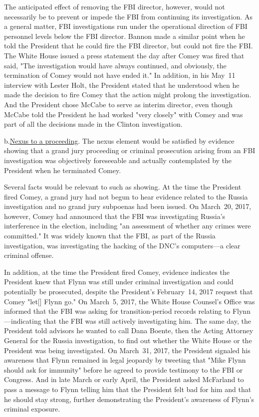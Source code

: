 The anticipated effect of removing the FBI director, however, would not necessarily be to prevent or impede the FBI from continuing its investigation.
As a general matter, FBI investigations run under the operational direction of FBI personnel levels below the FBI director.
Bannon made a similar point when he told the President that he could fire the FBI director, but could not fire the FBI\null.
The White House issued a press statement the day after Comey was fired that said, "The investigation would have always continued, and obviously, the termination of Comey would not have ended it."
In addition, in his May~11 interview with Lester Holt, the President stated that he understood when he made the decision to fire Comey that the action might prolong the investigation.
And the President chose McCabe to serve as interim director, even though McCabe told the President he had worked "very closely" with Comey and was part of all the decisions made in the Clinton investigation.

b.\qquad\underline{Nexus to a proceeding}.
The nexus element would be satisfied by evidence showing that a grand jury proceeding or criminal prosecution arising from an FBI investigation was objectively foreseeable and actually contemplated by the President when he terminated Comey.

Several facts would be relevant to such as showing.
At the time the President fired Comey, a grand jury had not begun to hear evidence related to the Russia investigation and no grand jury subpoenas had been issued.
On March~20, 2017, however, Comey had announced that the FBI was investigating Russia's interference in the election, including "an assessment of whether any crimes were committed."
It was widely known that the FBI, as part of the Russia investigation, was investigating the hacking of the DNC's computers---a clear criminal offense.

In addition, at the time the President fired Comey, evidence indicates the President knew that Flynn was still under criminal investigation and could potentially be prosecuted, despite the President's February~14, 2017 request that Comey "let[] Flynn go."
On March~5, 2017, the White House Counsel's Office was informed that the FBI was asking for transition-period records relating to Flynn---indicating that the FBI was still actively investigating him.
The same day, the President told advisors he wanted to call Dana Boente, then the Acting Attorney General for the Russia investigation, to find out whether the White House or the President was being investigated.
On March~31, 2017, the President signaled his awareness that Flynn remained in legal jeopardy by tweeting that "Mike Flynn should ask for immunity" before he agreed to provide testimony to the FBI or Congress.
And in late March or early April, the President asked McFarland to pass a message to Flynn telling him that the President felt bad for him and that he should stay strong, further demonstrating the President's awareness of Flynn's criminal exposure.

